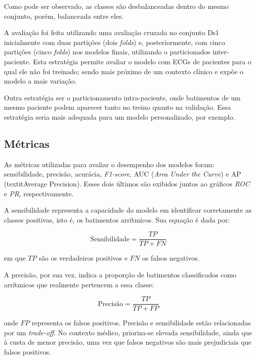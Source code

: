 Como pode ser observado, as classes são desbalanceadas dentro do mesmo conjunto, porém, balanceada entre eles.

A avaliação foi feita utilizando uma avaliação cruzada no conjunto Ds1 inicialmente com duas partições (dois \textit{folds}) e, posteriormente, com cinco partições (cinco \textit{folds}) nos modelos finais, utilizando o particionados
inter-paciente. Esta estratégia permite avaliar o modelo com ECGs de pacientes para o qual ele não foi treinado; sendo mais próximo de um contexto clínico 
e expõe o modelo a mais variação.

Outra estratégia ser o particionamento intra-paciente, onde batimentos de um mesmo paciente podem aparecer tanto no treino quanto na validação. Essa estratégia seria 
mais adequada para um modelo personalizado, por exemplo. 

\subsection{Métricas}
\label{sec:metricas}

As métricas utilizadas para avaliar o desempenho dos modelos foram: sensibilidade, precisão, acurácia, \textit{F1-score}, AUC (\textit{Area Under the Curve}) e AP (textit{Average Precision}). Esses 
dois últimos são exibidos juntos ao gráficos \textit{ROC} e \textit{PR}, respectivamente.

A sensibilidade representa a capacidade do modelo em identificar corretamente as classes positivas, isto é, os batimentos arrítmicos. Sua equação é dada por:

\begin{equation}
\text{Sensibilidade} = \frac{TP}{TP + FN}
\end{equation}

em que $TP$ são os verdadeiros positivos e $FN$ os falsos negativos.  

A precisão, por sua vez, indica a proporção de batimentos classificados como arrítmicos que realmente pertencem a essa classe:

\begin{equation}
\text{Precisão} = \frac{TP}{TP + FP}
\end{equation}

onde $FP$ representa os falsos positivos. Precisão e sensibilidade estão relacionadas por um \textit{trade-off}. No contexto médico, prioriza-se elevada sensibilidade, ainda que à custa de menor precisão, uma vez que falsos negativos são mais prejudiciais que falsos positivos.  

